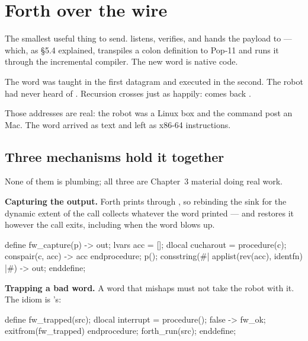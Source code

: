 \section{Forth over the wire}
\label{sec:forthwire}

The smallest useful thing to send.  listens, verifies,
and hands the payload to  --- which, as \S5.4 explained,
transpiles a colon definition to Pop-11 and runs it through the incremental
compiler. The new word is native code.


The word was taught in the first datagram and executed in the second. The
robot had never heard of . Recursion crosses just as happily:
 comes back .

Those addresses are real: the robot was a Linux  box and the
command post an  Mac. The word arrived as text and left as
x86-64 instructions.

\subsection{Three mechanisms hold it together}

None of them is plumbing; all three are Chapter~3 material doing real work.

\textbf{Capturing the output.} Forth prints through , so
rebinding the sink for the dynamic extent of the call collects whatever the
word printed --- and  restores it however the call exits,
including when the word blows up.

\begin{pop}
define fw_capture(p) -> out;
    lvars acc = [];
    dlocal cucharout = procedure(c); conspair(c, acc) -> acc endprocedure;
    p();
    consstring(#| applist(rev(acc), identfn) |#) -> out;
enddefine;
\end{pop}

\textbf{Trapping a bad word.} A word that mishaps must not take the robot
with it. The idiom is 's:

\begin{pop}
define fw_trapped(src);
    dlocal interrupt =
        procedure(); false -> fw_ok; exitfrom(fw_trapped) endprocedure;
    forth_run(src);
enddefine;
\end{pop}

